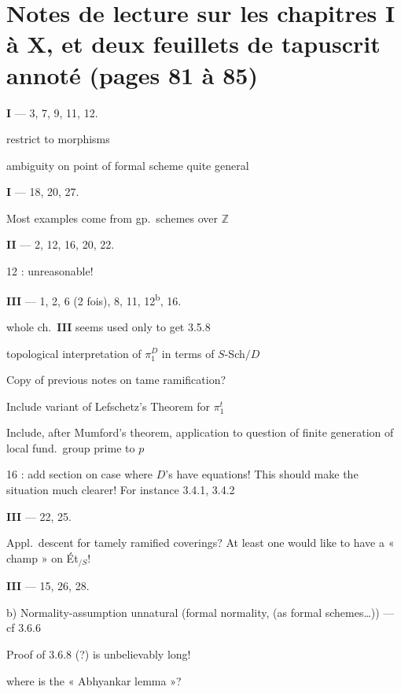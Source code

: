 \documentclass[11pt,a4paper]{article}
\begin{document}
\section*{Notes de lecture sur les chapitres I à X, et deux feuillets de tapuscrit annoté (pages 81 à 85)}


\textbf{I} — 3, 7, 9, 11, 12.

restrict to  morphisms

ambiguity on point of formal scheme quite general

\textbf{I} — 18, 20, 27.

Most examples come from \ill{} gp.\ schemes over $\mathbb{Z}$

\textbf{II} — 2, 12, 16, 20, 22.

12 : unreasonable!

\textbf{III} — 1, 2, 6 (2 fois), 8, 11, 12\textsuperscript{b}, 16.

whole ch.\ \textbf{III} seems  used only to get 3.5.8

topological interpretation of $\pi_1^{D}$ in terms of $S$-Sch$/D$

Copy of previous notes on tame ramification?

Include variant of Lefschetz's Theorem for $\pi_1^{t}$

Include, after Mumford's theorem, application to question of finite generation
of local \struck{\ill{}} fund.\ group prime to $p$

16 : add section on case where $D$'s have equations! This should make the
situation much clearer! For instance 3.4.1, 3.4.2

\textbf{III} — 22, 25.

Appl.\ descent for tamely ramified coverings? At least one would like to have a
« champ » on Ét$_{/S}$!

\textbf{III} — 15, 26, 28.

b) Normality-assumption unnatural (formal normality, (as formal schemes\ldots))
— cf 3.6.6

Proof of 3.6.8 (?) is unbelievably long!

where is the « Abhyankar lemma »?
\end{document}
